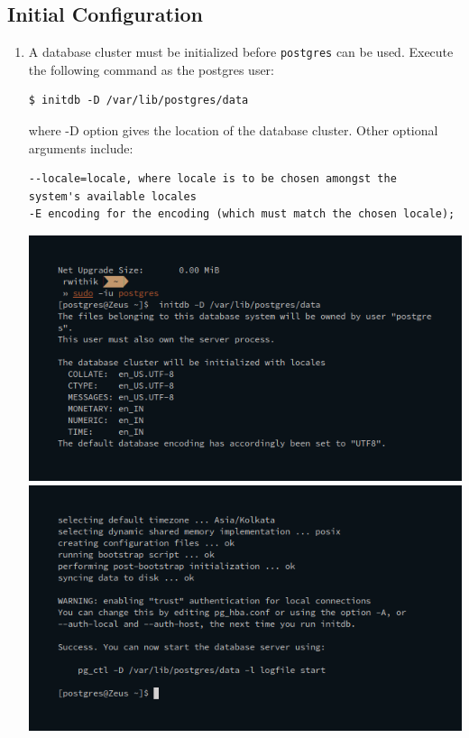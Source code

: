 \subsection{Initial Configuration}

\begin{enumerate}
\item A database cluster must be initialized before \texttt{postgres} can be used. Execute the following command as the postgres user:
\begin{verbatim}
$ initdb -D /var/lib/postgres/data
\end{verbatim}
where -D option gives the location of the database cluster.
Other optional arguments include:
\begin{verbatim}
--locale=locale, where locale is to be chosen amongst the
system's available locales
-E encoding for the encoding (which must match the chosen locale);
\end{verbatim}
\includegraphics[width=\linewidth]{../Images/Installation/3.png}\newline
\includegraphics[width=\linewidth]{../Images/Installation/4.png}\newline

\end{enumerate}

